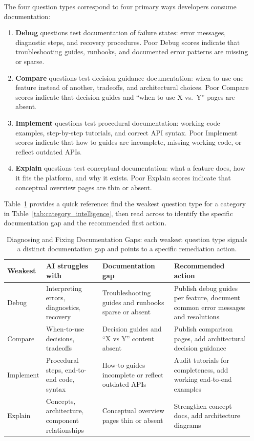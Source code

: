 \documentclass[10pt,letterpaper]{article}
\begin{document}
The four question types correspond to four primary ways developers consume documentation:

\begin{enumerate}[nosep]
  \item \textbf{Debug} questions test documentation of failure states: error messages, diagnostic steps, and recovery procedures. Poor Debug scores indicate that troubleshooting guides, runbooks, and documented error patterns are missing or sparse.

  \item \textbf{Compare} questions test decision guidance documentation: when to use one feature instead of another, tradeoffs, and architectural choices. Poor Compare scores indicate that decision guides and ``when to use X vs.\ Y'' pages are absent.

  \item \textbf{Implement} questions test procedural documentation: working code examples, step-by-step tutorials, and correct API syntax. Poor Implement scores indicate that how-to guides are incomplete, missing working code, or reflect outdated APIs.

  \item \textbf{Explain} questions test conceptual documentation: what a feature does, how it fits the platform, and why it exists. Poor Explain scores indicate that conceptual overview pages are thin or absent.
\end{enumerate}

Table~\ref{tab:pm_action} provides a quick reference: find the weakest question type for a category in Table~\ref{tab:category_intelligence}, then read across to identify the specific documentation gap and the recommended first action.

\begin{table}[tbp]
\centering
\caption{Diagnosing and Fixing Documentation Gaps: each weakest question type signals a distinct documentation gap and points to a specific remediation action.}
\label{tab:pm_action}
\small
\begin{tabularx}{\linewidth}{@{}l X X X@{}}
\toprule
\textbf{Weakest} & \textbf{AI struggles with} & \textbf{Documentation gap} & \textbf{Recommended action} \\
\midrule
Debug    & Interpreting errors, diagnostics, recovery & Troubleshooting guides and runbooks sparse or absent & Publish debug guides per feature, document common error messages and resolutions \\[4pt]
Compare  & When-to-use decisions, tradeoffs & Decision guides and ``X vs Y'' content absent & Publish comparison pages, add architectural decision guidance \\[4pt]
Implement& Procedural steps, end-to-end code, syntax & How-to guides incomplete or reflect outdated APIs & Audit tutorials for completeness, add working end-to-end examples \\[4pt]
Explain  & Concepts, architecture, component relationships & Conceptual overview pages thin or absent & Strengthen concept docs, add architecture diagrams \\
\bottomrule
\end{tabularx}
\end{table}
\end{document}
